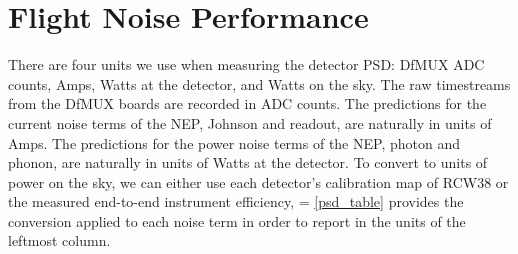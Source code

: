 \section{Flight Noise Performance}
\label{sec:flight_noise_performance}

There are four units we use when measuring the detector \ac{PSD}: \ac{DfMUX} \ac{ADC} counts, Amps, Watts at the detector, and Watts on the sky. 
The raw timestreams from the \ac{DfMUX} boards are recorded in \ac{ADC} counts. 
The predictions for the current noise terms of the \ac{NEP}, Johnson and readout, are naturally in units of Amps.
The predictions for the power noise terms of the \ac{NEP}, photon and phonon, are naturally in units of Watts at the detector. 
To convert to units of power on the sky, we can either use each detector's calibration map of RCW38 or the measured end-to-end instrument efficiency, 
\be
\varepsilon = 
\label{eq:eff_ratio}
\ee
\TAB\ref{psd_table} provides the conversion applied to each noise term in order to report in the units of the leftmost column. 



